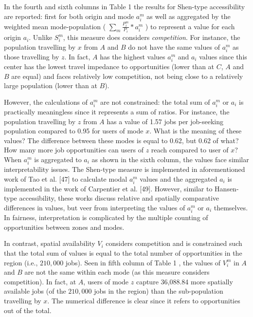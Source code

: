 \documentclass[10pt,letterpaper]{article}
\begin{document}
In the fourth and sixth columns in Table 1 the results for Shen-type
accessibility are reported: first for both origin and mode \(a_i^m\) as
well as aggregated by the weighted mean mode-population (
\(\sum_m \frac{P_i^m}{P_i}*a_i^m\) ) to represent a value for each
origin \(a_i\). Unlike \(S_i^m\), this measure does considers
\emph{competition}. For instance, the population travelling by \(x\)
from \(A\) and \(B\) do not have the same values of \(a_i^m\) as those
travelling by \(z\). In fact, \(A\) has the highest values \(a_i^m\) and
\(a_i\) values since this center has the lowest travel impedance to
opportunities (lower than at \(C\), \(A\) and \(B\) are equal) and faces
relatively low competition, not being close to a relatively large
population (lower than at \(B\)).

However, the calculations of \(a_i^m\) are not constrained: the total
sum of \(a_i^m\) or \(a_i\) is practically meaningless since it
represents a sum of ratios. For instance, the population travelling by
\(z\) from \(A\) has a value of 1.57 jobs per job-seeking population
compared to 0.95 for users of mode \(x\). What is the meaning of these
values? The difference between these modes is equal to 0.62, but 0.62 of
what? How many more job opportunities can users of \(z\) reach compared
to user of \(x\)? When \(a_i^m\) is aggregated to \(a_i\) as shown in
the sixth column, the values face similar interpretability issues. The
Shen-type measure is implemented in aforementioned work of Tao et al.
{[}47{]} to calculate modal \(a_i^m\) values and the aggregated \(a_i\)
is implemented in the work of Carpentier et al. {[}49{]}. However,
similar to Hansen-type accessibility, these works discuss relative and
spatially comparative differences in values, but veer from interpreting
the values of \(a_i^m\) or \(a_i\) themselves. In fairness,
interpretation is complicated by the multiple counting of opportunities
between zones and modes.

In contrast, spatial availability \(V_i\) considers competition and is
constrained such that the total sum of values is equal to the total
number of opportunities in the region (i.e., \(210,000\) jobs). Seen in
fifth column of Table 1 , the values of \(V_i^m\) in \(A\) and \(B\) are
not the same within each mode (as this measure considers competition).
In fact, at \(A\), users of mode \(z\) capture 36,088.84 more spatially
available jobs (of the \(210,000\) jobs in the region) than the
sub-population travelling by \(x\). The numerical difference is clear
since it refers to opportunities out of the total.
\end{document}
